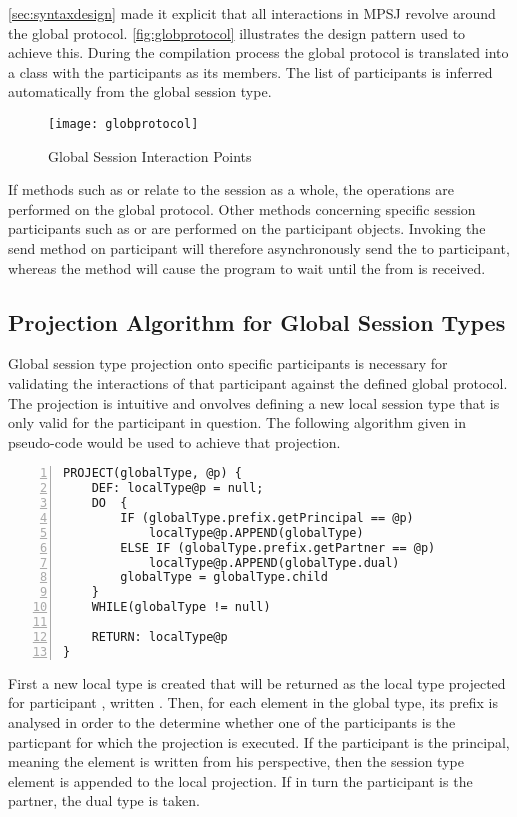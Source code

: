 \autoref{sec:syntaxdesign} made it explicit that all interactions in MPSJ revolve around the global protocol. \autoref{fig:globprotocol} illustrates the design pattern used to achieve this. During the compilation process the global protocol is translated into a class with the participants as its members. The list of participants is inferred automatically from the global session type.

\begin{figure}[H]
\begin{center}
\texttt{[image: globprotocol]}
\caption{Global Session Interaction Points}
\label{fig:globprotocol}
\end{center}
\end{figure}

If methods such as  or  relate to the session as a whole, the operations are performed on the global protocol. Other methods concerning specific session participants such as  or  are performed on the participant objects. Invoking the send method on participant  will therefore asynchronously send the  to participant, whereas the method  will cause the program to wait until the  from  is received.


\subsection{Projection Algorithm for Global Session Types}

Global session type projection onto specific participants is necessary for validating the interactions of that participant against the defined global protocol. The projection is intuitive and onvolves defining a new local session type that is only valid for the participant in question. The following algorithm given in pseudo-code would be used to achieve that projection. 


\begin{lstlisting}[basicstyle=\LISTINGSTYLE, numbers=left]
PROJECT(globalType, @p) {
	DEF: localType@p = null;
	DO	{
		IF (globalType.prefix.getPrincipal == @p)
			localType@p.APPEND(globalType)
		ELSE IF (globalType.prefix.getPartner == @p)
			localType@p.APPEND(globalType.dual)
		globalType = globalType.child
	}
	WHILE(globalType != null)

	RETURN: localType@p
}
\end{lstlisting}

First a new local type is created that will be returned as the local type projected for participant , written . Then, for each element in the global type, its prefix is analysed in order to the determine whether one of the participants is the particpant for which the projection is executed. If the participant is the principal, meaning the element is written from his perspective, then the session type element is appended to the local projection. If in turn the participant is the partner, the dual type is taken. 

